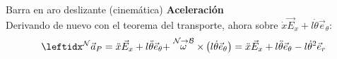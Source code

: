 \begin{solucion}{Barra en aro deslizante (cinemática)}
\textbf{Aceleración}\\
Derivando de nuevo con el teorema del transporte, ahora sobre $\dot{x}\vec{E}_x+l\dot\theta\vec{e}_\theta$:
$$\marc{\vec{a}_P}{N}=\ddot{x}\vec{E}_x+l\ddot\theta\vec{e}_\theta+\velang{N}{B}\times\left(l\dot\theta\vec{e}_\theta\right)=\ddot{x}\vec{E}_x+l\ddot\theta\vec{e}_\theta-l\dot\theta^2\vec{e}_r$$

\end{solucion}
